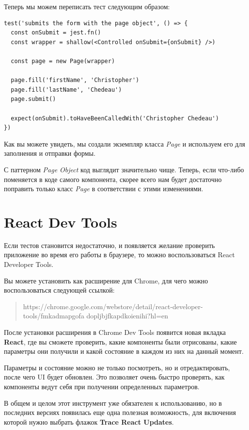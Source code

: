 Теперь мы можем переписать тест следующим образом:

\begin{lstlisting}
test('submits the form with the page object', () => {
  const onSubmit = jest.fn()
  const wrapper = shallow(<Controlled onSubmit={onSubmit} />)
  
  const page = new Page(wrapper)
  
  page.fill('firstName', 'Christopher')
  page.fill('lastName', 'Chedeau')
  page.submit()
  
  expect(onSubmit).toHaveBeenCalledWith('Christopher Chedeau')
})
\end{lstlisting}

Как вы можете увидеть, мы создали экземпляр класса \textit{Page} и используем его для заполнения и отправки формы.

С паттерном \textit{Page Object} код выглядит значительно чище. Теперь, если что-либо поменяется в коде самого компонента, скорее всего нам будет достаточно поправить только класс \textit{Page} в соответствии с этими изменениями.

\section{React Dev Tools}

Если тестов становится недостаточно, и появляется желание проверить приложение во время его работы в браузере, то можно воспользоваться React Developer Tools.

Вы можете установить как расширение для Chrome, для чего можно воспользоваться следующей ссылкой: 

\begin{quotation}
https://chrome.google.com/webstore/detail/react-developer-tools/fmkadmapgofa dopljbjfkapdkoienihi?hl=en
\end{quotation}

После установки расширения в Chrome Dev Tools появится новая вкладка \textbf{React}, где вы сможете проверить, какие компоненты были отрисованы, какие параметры они получили и какой состояние в каждом из них на данный момент.

Параметры и состояние можно не только посмотреть, но и отредактировать, после чего UI будет обновлен. Это позволяет очень быстро проверять, как компоненты ведут себя при получении определенных параметров.

В общем и целом этот инструмент уже обязателен к использованию, но в последних версиях появилась еще одна полезная возможность, для включения которой нужно выбрать флажок \textbf{Trace React Updates}.

